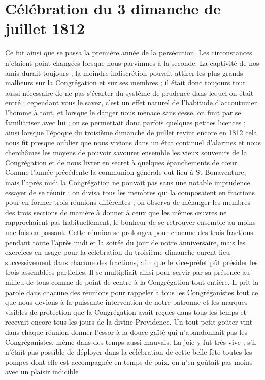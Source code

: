 \section*{Célébration du 3 dimanche de juillet 1812}
Ce fut ainsi que se passa la première année de la persécution. Les circonstances n'étaient point changées lorsque nous parvînmes à la seconde. La captivité de nos amis durait toujours ; la moindre indiscrétion pouvait attirer les plus grands malheurs sur la Congrégation et sur ses membres ; il était donc toujours tout aussi nécessaire de ne pas s'écarter du système de prudence dans lequel on était entré ; cependant vous le savez, c'est un effet naturel de l'habitude d'accoutumer l'homme à tout, et lorsque le danger nous menace sans cesse, on finit par se familiariser avec lui ; on se permettait donc parfois quelques petites licences ; ainsi lorsque l'époque du troisième dimanche de juillet revint encore en 1812 cela nous fit presque oublier que nous vivions dans un état continuel
d'alarmes et nous cherchâmes les moyens de pouvoir savourer ensemble les vieux souvenirs de la Congrégation et de nous livrer en secret à quelques épanchements de cœur. Comme l'année précédente la communion générale eut lieu à St Bonaventure, mais l'après midi la Congrégation ne pouvait pas sans une notable imprudence essayer de se réunir ; on divisa tous les membres qui la composaient en fractions pour en former trois réunions différentes ; on observa de mélanger les membres des trois sections de manière à donner à ceux que les mêmes œuvres ne rapprochaient pas habituellement, le bonheur de se retrouver ensemble au moins une fois en passant. Cette réunion se prolongea pour chacune des trois fractions pendant toute l'après midi et la soirée du jour de notre anniversaire, mais les exercices en usage pour la célébration du troisième dimanche eurent lieu successivement dans chacune des fractions, afin que le vice-préfet pût présider les trois assemblées partielles. Il se multipliait ainsi pour servir par sa présence au milieu de tous comme de point de centre à la Congrégation tout entière. Il prit la parole dans chacune des réunions pour rappeler à tous les Congréganistes tout ce que nous devions à la puissante intervention de notre patronne et les marques visibles de protection que la Congrégation avait reçues dans tous les temps et recevait encore tous les jours de la divine Providence. Un tout petit goûter vint dans chaque réunion donner l'essor à la douce gaîté qui n'abandonnait pas les Congréganistes, même dans des temps aussi mauvais. La joie y fut très vive ; s'il n'était pas possible de déployer dans la célébration de cette belle fête toutes les pompes dont elle est accompagnée en temps de paix, on n'en goûtait pas moins avec un plaisir indicible
